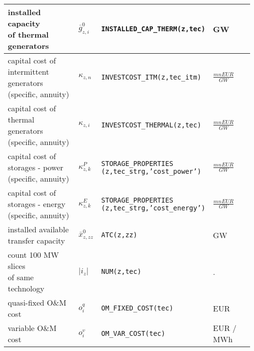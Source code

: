 \documentclass[11pt,a4paper]{article}
\begin{document}
\begin{tabular}{l l l l}
\makecell[l]{installed capacity \\of thermal generators} & $\bar{g}^{0}_{z,i}$ & \texttt{INSTALLED\_CAP\_THERM(z,tec)} & GW \\ \hline
\makecell[l]{capital cost of \\intermittent generators \\(specific, annuity)} & $\kappa_{z,n}$ & \texttt{INVESTCOST\_ITM(z,tec\_itm)} & $\frac{mn EUR}{GW}$ \\ \hline
\makecell[l]{capital cost of \\thermal generators \\(specific, annuity)} & $\kappa_{z,i}$ & \texttt{INVESTCOST\_THERMAL(z,tec)} & $\frac{mn EUR}{GW}$ \\ \hline
\makecell[l]{capital cost of \\storages - power \\(specific, annuity)} & $\kappa^{P}_{z,k}$ & \makecell[l]{\texttt{STORAGE\_PROPERTIES} \\ \texttt{(z,tec\_strg,'cost\_power')}} & $\frac{mn EUR}{GW}$ \\ \hline
\makecell[l]{capital cost of \\storages - energy \\(specific, annuity)} & $\kappa^{E}_{z,k}$ & \makecell[l]{\texttt{STORAGE\_PROPERTIES} \\ \texttt{(z,tec\_strg,'cost\_energy')}} & $\frac{mn EUR}{GW}$ \\ \hline
\makecell[l]{installed available \\transfer capacity} & $\bar{x}^{0}_{z,zz}$ & \texttt{ATC(z,zz)} & GW \\ \hline
\makecell[l]{count 100 MW slices \\of same technology} & $|i_{z}|$ & \texttt{NUM(z,tec)} & . \\ \hline
quasi-fixed O\&M cost & $o^{q}_{i}$ & \texttt{OM\_FIXED\_COST(tec)} & EUR \\ \hline
variable O\&M cost & $o^{v}_{i}$ & \texttt{OM\_VAR\_COST(tec)} & EUR / MWh \\ \hline
\hline
\end{tabular}
\end{document}
